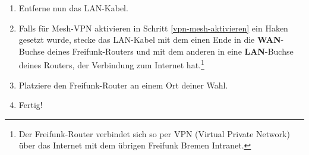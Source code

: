 \documentclass{article}
\begin{document}
\begin{enumerate}
\item Entferne nun das LAN-Kabel.

\item Falls für \glqq{}Mesh-VPN aktivieren\grqq{} in Schritt \ref{vpn-mesh-aktivieren} ein Haken gesetzt wurde, stecke das LAN-Kabel mit dem einen Ende in die \textbf{WAN}-Buchse deines Freifunk-Routers und mit dem anderen in eine \textbf{LAN}-Buchse deines Routers, der Verbindung zum Internet hat.\footnote{Der Freifunk-Router verbindet sich so per VPN (Virtual Private Network) über das Internet mit dem übrigen Freifunk Bremen Intranet.}

\item Platziere den Freifunk-Router an einem Ort deiner Wahl. \label{platzieren}

%
\item Fertig!
\end{enumerate}
\end{document}
